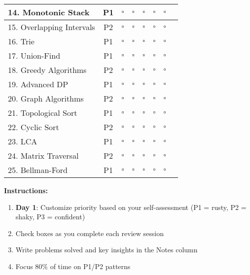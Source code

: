 \documentclass[10pt]{article}
\begin{document}
\begin{center}
\begin{longtable}{|p{3.2cm}|c|c|c|c|c|c|p{3.5cm}|}
\hline
14. Monotonic Stack & \cellcolor{priority1}P1 & $\square$ & $\square$ & $\square$ & $\square$ & $\square$ & \\
\hline
15. Overlapping Intervals & \cellcolor{priority2}P2 & $\square$ & $\square$ & $\square$ & $\square$ & $\square$ & \\
\hline
16. Trie & \cellcolor{priority1}P1 & $\square$ & $\square$ & $\square$ & $\square$ & $\square$ & \\
\hline
17. Union-Find & \cellcolor{priority1}P1 & $\square$ & $\square$ & $\square$ & $\square$ & $\square$ & \\
\hline
18. Greedy Algorithms & \cellcolor{priority2}P2 & $\square$ & $\square$ & $\square$ & $\square$ & $\square$ & \\
\hline
19. Advanced DP & \cellcolor{priority1}P1 & $\square$ & $\square$ & $\square$ & $\square$ & $\square$ & \\
\hline
20. Graph Algorithms & \cellcolor{priority2}P2 & $\square$ & $\square$ & $\square$ & $\square$ & $\square$ & \\
\hline
21. Topological Sort & \cellcolor{priority1}P1 & $\square$ & $\square$ & $\square$ & $\square$ & $\square$ & \\
\hline
22. Cyclic Sort & \cellcolor{priority2}P2 & $\square$ & $\square$ & $\square$ & $\square$ & $\square$ & \\
\hline
23. LCA & \cellcolor{priority1}P1 & $\square$ & $\square$ & $\square$ & $\square$ & $\square$ & \\
\hline
24. Matrix Traversal & \cellcolor{priority2}P2 & $\square$ & $\square$ & $\square$ & $\square$ & $\square$ & \\
\hline
25. Bellman-Ford & \cellcolor{priority1}P1 & $\square$ & $\square$ & $\square$ & $\square$ & $\square$ & \\
\hline
\end{longtable}
\end{center}

\textbf{Instructions:}
\begin{enumerate}
\item \textbf{Day 1}: Customize priority based on your self-assessment (P1 = rusty, P2 = shaky, P3 = confident)
\item Check boxes as you complete each review session
\item Write problems solved and key insights in the Notes column
\item Focus 80\% of time on P1/P2 patterns
\end{enumerate}
\end{document}
